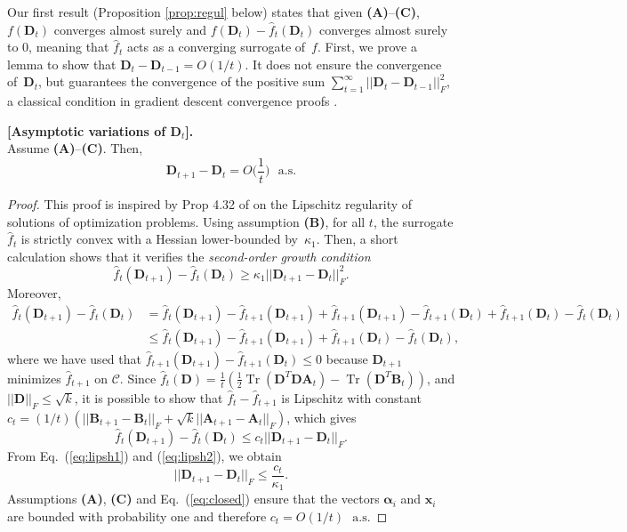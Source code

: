 \documentclass[twoside,11pt]{article}
\def\x{{\mathbf x}}
\def\hatf{{ \hat f}}
\def\as{\text{~~a.s.}}
\def\alphab{{\boldsymbol\alpha}}
\def\D{{\mathbf D}}
\def\B{{\mathbf B}}
\def\O{{O}}
\def\C{{\mathcal C}}
\def\hatf{{ \hat f}}
\def\A{{\mathbf A}}
\def\trace{\operatorname{Tr}}
\begin{document}
Our first result (Proposition \ref{prop:regul} below) states that given {\bf
(A)}--{\bf (C)}, 
$f(\D_t)$ converges almost surely and 
$f(\D_t)-\hatf_t(\D_t)$ converges almost surely to $0$, meaning that
$\hatf_t$ acts as a converging surrogate of~$f$.
First, we prove a lemma to show that $\D_t-\D_{t-1}=O(1/t)$. It 
does not ensure the convergence of~$\D_t$, but guarantees 
the convergence of the positive sum $\sum_{t=1}^\infty ||\D_t-\D_{t-1}||_F^2$,
a classical condition in gradient descent convergence proofs
\citep{bertsekas}.  
\begin{lemma}{\bf [Asymptotic variations of $\D_t$].\\} \label{lemma:prelim}
   Assume {\bf (A)}--{\bf (C)}. Then,
   \begin{displaymath}
      \D_{t+1}-\D_{t} = \O\Big(\frac{1}{t}\Big) \as
   \end{displaymath}
\end{lemma}
\begin{proof}
   This proof is inspired by Prop 4.32 of \citet{bonnans2} on the Lipschitz
   regularity of solutions of optimization problems.
   Using assumption {\bf (B)}, for all $t$, the surrogate $\hatf_t$ is 
   strictly convex with a Hessian lower-bounded by~$\kappa_1$. Then, a short
   calculation shows that it verifies the {\em second-order growth condition}
   \begin{equation}
      \hatf_t(\D_{t+1})-\hatf_t(\D_t) \geq \kappa_1 ||\D_{t+1}-\D_t||_F^2. \label{eq:lipsh1}
   \end{equation}
   Moreover,
   \begin{displaymath}
      \begin{split}
      \hatf_t(\D_{t+1})-\hatf_t(\D_t) &=
      \hatf_t(\D_{t+1})-\hatf_{t+1}(\D_{t+1}) + \hatf_{t+1}(\D_{t+1}) -
      \hatf_{t+1}(\D_{t}) + \hatf_{t+1}(\D_{t}) - \hatf_t(\D_t) \\
      & \leq  \hatf_t(\D_{t+1})-\hatf_{t+1}(\D_{t+1}) + \hatf_{t+1}(\D_{t}) - \hatf_t(\D_t),
   \end{split}
   \end{displaymath}
   where we have used that $\hatf_{t+1}(\D_{t+1})-\hatf_{t+1}(\D_{t}) \leq 0$ because $\D_{t+1}$ minimizes
   $\hatf_{t+1}$ on $\C$.
   Since $\hatf_t(\D) = \frac{1}{t}(\frac{1}{2}\trace(\D^T\D\A_t)-\trace(\D^T\B_t))$, and $||\D||_F \leq \sqrt{k}$, 
   it is possible to show that
   $\hatf_t - \hatf_{t+1}$ is Lipschitz with constant $c_t=(1/t)(||\B_{t+1}-\B_t||_F+\sqrt{k}||\A_{t+1}-\A_t||_F)$,
   which gives
   \begin{equation}
      \hatf_t(\D_{t+1})-\hatf_t(\D_t)  \leq c_t||\D_{t+1}-\D_t||_F. \label{eq:lipsh2}
   \end{equation}
   From Eq.~(\ref{eq:lipsh1}) and (\ref{eq:lipsh2}), we obtain
   \begin{displaymath}
      ||\D_{t+1}-\D_t||_F \leq \frac{c_t}{\kappa_1}.
   \end{displaymath}
   Assumptions {\bf (A)}, {\bf (C)} and Eq.~(\ref{eq:closed}) ensure that the
   vectors $\alphab_i$ and $\x_i$ are bounded with probability one and therefore
   $c_t = \O(1/t) \as$
\end{proof}
\end{document}
